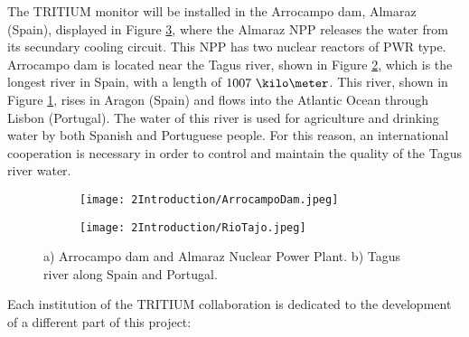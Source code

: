 The TRITIUM monitor will be installed in the Arrocampo dam, Almaraz (Spain), displayed in Figure \ref{fig:Arrocampo}, where the Almaraz NPP releases the water from its secundary cooling circuit. This NPP has two nuclear reactors of PWR type. Arrocampo dam is located near the Tagus river, shown in Figure \ref{subfig:TajusRiver}, which is the longest river in Spain, with a length of $1007~\kilo\meter$. This river, shown in Figure \ref{subfig:Arrocampo_Dam}, rises in Aragon (Spain) and flows into the Atlantic Ocean through Lisbon (Portugal). The water of this river is used for agriculture and drinking water by both Spanish and Portuguese people. For this reason, an international cooperation is necessary in order to control and maintain the quality of the Tagus river water.

\begin{figure}
\centering
    \begin{subfigure}[b]{0.45\textwidth}
    \centering
    \texttt{[image: 2Introduction/ArrocampoDam.jpeg]}  
    \caption{\label{subfig:Arrocampo_Dam}}
    \end{subfigure}
    \hfill
    \begin{subfigure}[b]{0.45\textwidth}
    \centering
    \texttt{[image: 2Introduction/RioTajo.jpeg]}  
    \caption{\label{subfig:TajusRiver}}
    \end{subfigure}
 \caption{a) Arrocampo dam and Almaraz Nuclear Power Plant. b) Tagus river along Spain and Portugal.}
 \label{fig:Arrocampo}
\end{figure}

Each institution of the TRITIUM collaboration is dedicated to the development of a different part of this project:

